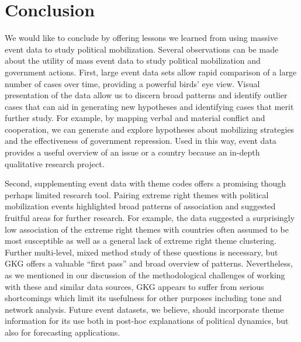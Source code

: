 \documentclass[10pt]{article}
\begin{document}
\section{Conclusion}

We would like to conclude by offering lessons we learned from using massive event data to study political mobilization. Several observations can be made about the utility of mass event data to study political mobilization and government actions.  First, large event data sets allow rapid comparison of a large number of cases over time, providing a powerful birds' eye view.  Visual presentation of the data allow us to discern broad patterns and identify outlier cases that can aid in generating new hypotheses and identifying cases that merit further study.  For example, by mapping verbal and material conflict and cooperation, we can generate and explore hypotheses about mobilizing strategies and the effectiveness of government repression. Used in this way, event data provides a useful overview of an issue or a country because an in-depth qualitative research project.

Second, supplementing event data with theme codes offers a promising though perhaps limited research tool.   Pairing extreme right themes with political mobilization events highlighted broad patterns of association and suggested fruitful areas for further research.  For example, the data suggested a surprisingly low association of the extreme right themes with countries often assumed to be most susceptible as well as a general lack of extreme right theme clustering.  Further multi-level, mixed method study of these questions is necessary, but GKG offers a valuable ``first pass'' and broad overview of patterns.  Nevertheless, as we mentioned in our discussion of the methodological challenges of working with these and similar data sources, GKG appears to suffer from serious shortcomings which limit its usefulness for other purposes including tone and network analysis. Future event datasets, we believe, should incorporate theme information for its use both in post-hoc explanations of political dynamics, but also for forecasting applications.
\end{document}
